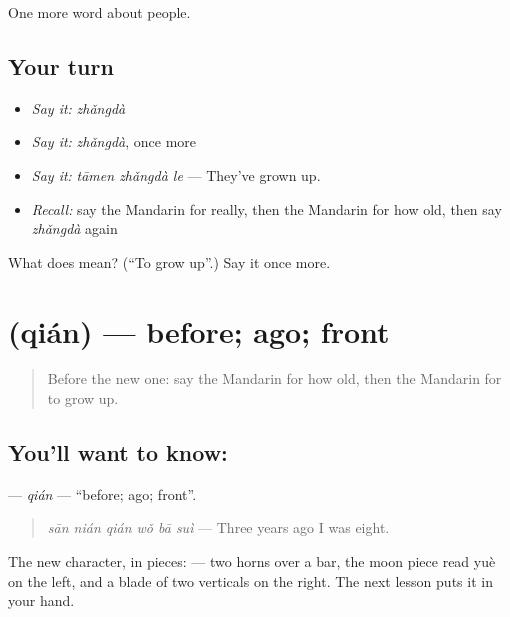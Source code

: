 \begin{grammarlens}[title={What you've built}]
One more word about people.
\end{grammarlens}

\subsection*{Your turn}
\begin{itemize}
\raggedright
  \item \emph{Say it:} \emph{zhǎngdà}
  \item \emph{Say it:} \emph{zhǎngdà}, once more
  \item \emph{Say it:} \emph{tāmen zhǎngdà le} — They've grown up.
  \item \emph{Recall:} say the Mandarin for really, then the Mandarin for how old, then say \emph{zhǎngdà} again
\end{itemize}

\begin{tcolorbox}[breakable,colback=teal!4,colframe=teal!35!black,title={Before you move on}]
What does  mean? (\textquotedblleft{}To grow up\textquotedblright{}.) Say it once more.
\end{tcolorbox}
\section[\texorpdfstring{\zh{前} (qián)}{前 (qián)}]{ (qián) — before; ago; front}

\label{lesson:ZH-C78-qian}



\begin{quote}
Before the new one: say the Mandarin for how old, then the Mandarin for to grow up.
\end{quote}

\subsection*{You'll want to know: }
\textbf{} — \emph{qián} — \textquotedblleft{}before; ago; front\textquotedblright{}.

\begin{quote}
\textbf{} \emph{sān nián qián wǒ bā suì} — Three years ago I was eight.
\end{quote}

The new character, in pieces:  — two horns over a bar, the moon piece read yuè on the left, and a blade of two verticals on the right. The next lesson puts it in your hand.

